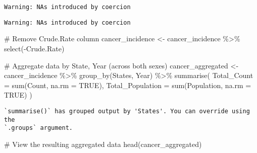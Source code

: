 \documentclass[
  12pt,
]{article}
\newenvironment{Shaded}{\begin{snugshade}}{\end{snugshade}}
\newcommand{\AttributeTok}[1]{\textcolor[rgb]{0.40,0.45,0.13}{#1}}
\newcommand{\CommentTok}[1]{\textcolor[rgb]{0.37,0.37,0.37}{#1}}
\newcommand{\ConstantTok}[1]{\textcolor[rgb]{0.56,0.35,0.01}{#1}}
\newcommand{\FunctionTok}[1]{\textcolor[rgb]{0.28,0.35,0.67}{#1}}
\newcommand{\NormalTok}[1]{\textcolor[rgb]{0.00,0.23,0.31}{#1}}
\newcommand{\OtherTok}[1]{\textcolor[rgb]{0.00,0.23,0.31}{#1}}
\newcommand{\SpecialCharTok}[1]{\textcolor[rgb]{0.37,0.37,0.37}{#1}}
\begin{document}
\begin{verbatim}
Warning: NAs introduced by coercion
\end{verbatim}

\begin{Shaded}
\end{Shaded}

\begin{verbatim}
Warning: NAs introduced by coercion
\end{verbatim}

\begin{Shaded}
\begin{Highlighting}[]
\CommentTok{\# Remove \textquotesingle{}Crude.Rate\textquotesingle{} column}
\NormalTok{cancer\_incidence }\OtherTok{\textless{}{-}}\NormalTok{ cancer\_incidence }\SpecialCharTok{\%\textgreater{}\%}
  \FunctionTok{select}\NormalTok{(}\SpecialCharTok{{-}}\NormalTok{Crude.Rate)}

\CommentTok{\# Aggregate data by State, Year (across both sexes)}
\NormalTok{cancer\_aggregated }\OtherTok{\textless{}{-}}\NormalTok{ cancer\_incidence }\SpecialCharTok{\%\textgreater{}\%}
  \FunctionTok{group\_by}\NormalTok{(States, Year) }\SpecialCharTok{\%\textgreater{}\%}
  \FunctionTok{summarise}\NormalTok{(}
    \AttributeTok{Total\_Count =} \FunctionTok{sum}\NormalTok{(Count, }\AttributeTok{na.rm =} \ConstantTok{TRUE}\NormalTok{), }
    \AttributeTok{Total\_Population =} \FunctionTok{sum}\NormalTok{(Population, }\AttributeTok{na.rm =} \ConstantTok{TRUE}\NormalTok{)}
\NormalTok{  )}
\end{Highlighting}
\end{Shaded}

\begin{verbatim}
`summarise()` has grouped output by 'States'. You can override using the
`.groups` argument.
\end{verbatim}

\begin{Shaded}
\begin{Highlighting}[]
\CommentTok{\# View the resulting aggregated data}
\FunctionTok{head}\NormalTok{(cancer\_aggregated)}
\end{Highlighting}
\end{Shaded}
\end{document}
